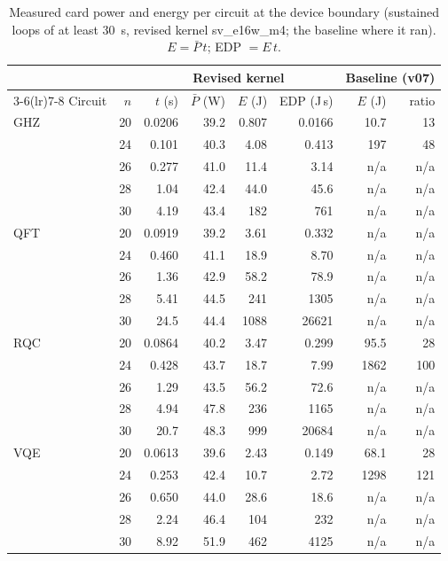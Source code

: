 \documentclass[pdflatex,sn-mathphys-num]{sn-jnl}
\newcommand{\NumEnergyLoopS}{30}
\theoremstyle{thmstyleone}
\theoremstyle{thmstylethree}
\begin{document}
\begin{table}
\centering
\caption{Measured card power and energy per circuit at the device boundary (sustained loops of at least \NumEnergyLoopS~s, revised kernel sv\_e16w\_m4; the baseline where it ran). $E = \bar P\,t$; EDP $= E\,t$.}\label{tab:energy}
\small
\begin{tabular}{lrrrrrrr}
\toprule
 & & \multicolumn{4}{c}{Revised kernel} & \multicolumn{2}{c}{Baseline (v07)} \\
\cmidrule(lr){3-6}\cmidrule(lr){7-8}
Circuit & $n$ & $t$ (s) & $\bar P$ (W) & $E$ (J) & EDP (J\,s) & $E$ (J) & ratio \\
\midrule
GHZ & 20 & 0.0206 & 39.2 & 0.807 & 0.0166 & 10.7 & 13 \\
 & 24 & 0.101 & 40.3 & 4.08 & 0.413 & 197 & 48 \\
 & 26 & 0.277 & 41.0 & 11.4 & 3.14 & n/a & n/a \\
 & 28 & 1.04 & 42.4 & 44.0 & 45.6 & n/a & n/a \\
 & 30 & 4.19 & 43.4 & 182 & 761 & n/a & n/a \\
\addlinespace
QFT & 20 & 0.0919 & 39.2 & 3.61 & 0.332 & n/a & n/a \\
 & 24 & 0.460 & 41.1 & 18.9 & 8.70 & n/a & n/a \\
 & 26 & 1.36 & 42.9 & 58.2 & 78.9 & n/a & n/a \\
 & 28 & 5.41 & 44.5 & 241 & 1305 & n/a & n/a \\
 & 30 & 24.5 & 44.4 & 1088 & 26621 & n/a & n/a \\
\addlinespace
RQC & 20 & 0.0864 & 40.2 & 3.47 & 0.299 & 95.5 & 28 \\
 & 24 & 0.428 & 43.7 & 18.7 & 7.99 & 1862 & 100 \\
 & 26 & 1.29 & 43.5 & 56.2 & 72.6 & n/a & n/a \\
 & 28 & 4.94 & 47.8 & 236 & 1165 & n/a & n/a \\
 & 30 & 20.7 & 48.3 & 999 & 20684 & n/a & n/a \\
\addlinespace
VQE & 20 & 0.0613 & 39.6 & 2.43 & 0.149 & 68.1 & 28 \\
 & 24 & 0.253 & 42.4 & 10.7 & 2.72 & 1298 & 121 \\
 & 26 & 0.650 & 44.0 & 28.6 & 18.6 & n/a & n/a \\
 & 28 & 2.24 & 46.4 & 104 & 232 & n/a & n/a \\
 & 30 & 8.92 & 51.9 & 462 & 4125 & n/a & n/a \\
\bottomrule
\end{tabular}
\end{table}
\end{document}
